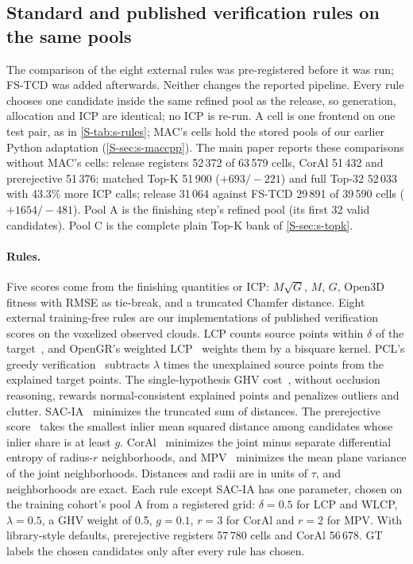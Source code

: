 \subsection{Standard and published verification rules on the same pools}
\label{S-sec:s-selectors}

The comparison of the eight external rules was pre-registered before it was run; FS-TCD was added afterwards. Neither changes the reported pipeline. Every rule chooses one candidate inside the same refined pool as the release, so generation, allocation and ICP are identical; no ICP is re-run. A cell is one frontend on one test pair, as in \cref{S-tab:s-rules}; MAC's cells hold the stored pools of our earlier Python adaptation (\cref{S-sec:s-maccpp}). The main paper reports these comparisons without MAC's cells: release registers 52\,372 of 63\,579 cells, CorAl 51\,432 and prerejective 51\,376; matched Top-K 51\,900 ($+693/{-}221$) and full Top-32 52\,033 with 43.3\% more ICP calls; release 31\,064 against FS-TCD 29\,891 of 39\,590 cells ($+1654/{-}481$). Pool A is the finishing step's refined pool (its first 32 valid candidates). Pool C is the complete plain Top-K bank of \cref{S-sec:s-topk}.

\paragraph{Rules.} Five scores come from the finishing quantities or ICP: $M\sqrt G$, $M$, $G$, Open3D fitness with RMSE as tie-break, and a truncated Chamfer distance. Eight external training-free rules are our implementations of published verification scores on the voxelized observed clouds. LCP counts source points within $\delta$ of the target~\cite{aiger2008fpcs}, and OpenGR's weighted LCP~\cite{mellado2014super4pcs} weights them by a bisquare kernel. PCL's greedy verification~\cite{rusu2011pcl} subtracts $\lambda$ times the unexplained source points from the explained target points. The single-hypothesis GHV cost~\cite{aldoma2012ghv}, without occlusion reasoning, rewards normal-consistent explained points and penalizes outliers and clutter. SAC-IA~\cite{rusu2009fpfh} minimizes the truncated sum of distances. The prerejective score~\cite{buch2013prerejective} takes the smallest inlier mean squared distance among candidates whose inlier share is at least $g$. CorAl~\cite{adolfsson2021coral} minimizes the joint minus separate differential entropy of radius-$r$ neighborhoods, and MPV~\cite{razlaw2015mpv} minimizes the mean plane variance of the joint neighborhoods. Distances and radii are in units of $\tau$, and neighborhoods are exact. Each rule except SAC-IA has one parameter, chosen on the training cohort's pool A from a registered grid: $\delta=0.5$ for LCP and WLCP, $\lambda=0.5$, a GHV weight of 0.5, $g=0.1$, $r=3$ for CorAl and $r=2$ for MPV. With library-style defaults, prerejective registers 57\,780 cells and CorAl 56\,678. GT labels the chosen candidates only after every rule has chosen.

